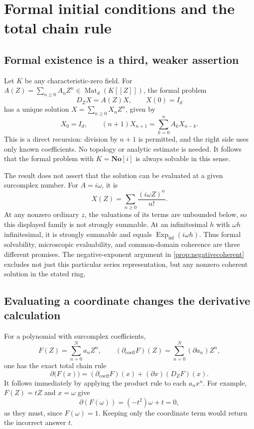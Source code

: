 \documentclass[11pt,letterpaper]{article}
\numberwithin{equation}{section}
\theoremstyle{definition}
\theoremstyle{remark}
\newcommand{\SC}{\mathbf{No}[i]}
\newcommand{\D}{\partial}
\newcommand{\Einf}{\operatorname{Exp}_{\mathrm{inf}}}
\newcommand{\Mat}{\operatorname{Mat}}
\begin{document}
\section{Formal initial conditions and the total chain rule}
\label{sec:bridge}

\subsection{Formal existence is a third, weaker assertion}
Let $K$ be any characteristic-zero field. For
$A(Z)=\sum_{n\ge0}A_nZ^n\in\Mat_d(K[[Z]])$, the formal problem
\[
 D_ZX=A(Z)X,\qquad X(0)=I_d
\]
has a unique solution $X=\sum_{n\ge0}X_nZ^n$, given by
\begin{equation}\label{eq:formal-recursion}
 X_0=I_d,\qquad
 (n+1)X_{n+1}=\sum_{k=0}^n A_kX_{n-k}.
\end{equation}
This is a direct recursion: division by $n+1$ is permitted, and the right
side uses only known coefficients. No topology or analytic estimate is
needed. It follows that the formal problem with $K=\SC$ is always
solvable in this sense.

The result does not assert that the solution can be evaluated at a given
surcomplex number. For $A=i\omega$, it is
\[
 X(Z)=\sum_{n\ge0}\frac{(i\omega Z)^n}{n!}.
\]
At any nonzero ordinary $z$, the valuations of its terms are unbounded
below, so this displayed family is not strongly summable. At an
infinitesimal $h$ with $\omega h$ infinitesimal, it is strongly summable
and equals $\Einf(i\omega h)$. Thus formal solvability, microscopic
evaluability, and common-domain coherence are three different promises.
The negative-exponent argument in \cref{prop:negativecoherent} excludes
not just this particular series representation, but any nonzero coherent
solution in the stated ring.

\subsection{Evaluating a coordinate changes the derivative calculation}
For a polynomial with surcomplex coefficients,
\[
 F(Z)=\sum_{n=0}^N a_nZ^n,
 \qquad (\D_{\mathrm{coeff}}F)(Z)=\sum_{n=0}^N(\D a_n)Z^n,
\]
one has the exact total chain rule
\begin{equation}\label{eq:totalchain}
 \D\bigl(F(x)\bigr)
   =(\D_{\mathrm{coeff}}F)(x)+(\D x)(D_ZF)(x).
\end{equation}
It follows immediately by applying the product rule to each $a_nx^n$.
For example, $F(Z)=tZ$ and $x=\omega$ give
\[
 \D(F(\omega))=(-t^2)\omega+t=0,
\]
as they must, since $F(\omega)=1$. Keeping only the coordinate term would
return the incorrect answer $t$.
\end{document}
